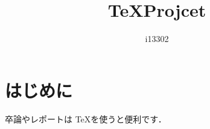 \documentclass[10pt]{jarticle}
\title{\TeX Projcet}
\author{i13302}
\begin{document}
 
\maketitle 
\section{はじめに}
卒論やレポートは \TeX を使うと便利です．
\end{document}
